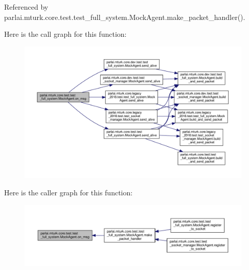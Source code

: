 Referenced by parlai.\+mturk.\+core.\+test.\+test\+\_\+full\+\_\+system.\+Mock\+Agent.\+make\+\_\+packet\+\_\+handler().

Here is the call graph for this function\+:
\nopagebreak
\begin{figure}[H]
\begin{center}
\leavevmode
\includegraphics[width=350pt]{classparlai_1_1mturk_1_1core_1_1test_1_1test__full__system_1_1MockAgent_a2186b39ea12603dd9c80ca0fca2e6892_cgraph}
\end{center}
\end{figure}
Here is the caller graph for this function\+:
\nopagebreak
\begin{figure}[H]
\begin{center}
\leavevmode
\includegraphics[width=350pt]{classparlai_1_1mturk_1_1core_1_1test_1_1test__full__system_1_1MockAgent_a2186b39ea12603dd9c80ca0fca2e6892_icgraph}
\end{center}
\end{figure}
\mbox{\label{classparlai_1_1mturk_1_1core_1_1test_1_1test__full__system_1_1MockAgent_aa3aaa3fa10d7f1ca6a135bcd28e18be4}} 
